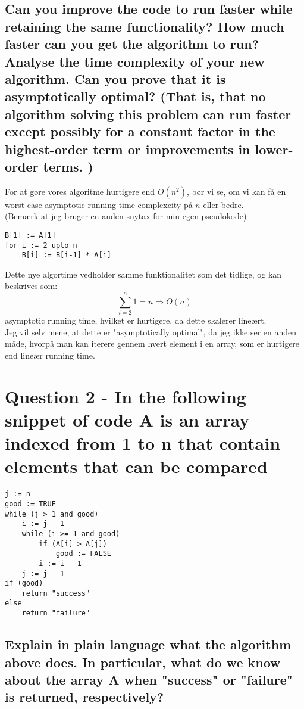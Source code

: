 \documentclass[a4paper,12pt]{article}
\begin{document}
\subsection[]{Can you improve the code to run faster while retaining the same functionality? How
much faster can you get the algorithm to run? Analyse the time complexity of your new
algorithm. Can you prove that it is asymptotically optimal? (That is, that no algorithm
solving this problem can run faster except possibly for a constant factor in the highest-order
term or improvements in lower-order terms. )}

For at gøre vores algoritme hurtigere end $O(n^2)$, bør vi se, om vi kan få en worst-case asymptotic running time complexcity på $n$ eller bedre.\\
(Bemærk at jeg bruger en anden snytax for min egen pseudokode)
\begin{lstlisting}
B[1] := A[1]     
for i := 2 upto n     
    B[i] := B[i-1] * A[i]
\end{lstlisting} 
Dette nye algortime vedholder samme funktionalitet som det tidlige, og kan beskrives som:
\[\sum_{i=2}^{n}1 = n \Rightarrow O(n)\]
asymptotic running time, hvilket er hurtigere, da dette skalerer lineært.\\
Jeg vil selv mene, at dette er "asymptotically optimal", da jeg ikke ser en anden måde, hvorpå man kan iterere gennem hvert element i en array, som er hurtigere end lineær running time.

\section[Question 2]{Question 2 - In the following snippet of code A is an array indexed from 1 to n that contain elements
that can be compared}

\begin{lstlisting}
j := n
good := TRUE
while (j > 1 and good)
    i := j - 1
    while (i >= 1 and good)
        if (A[i] > A[j])
            good := FALSE
        i := i - 1
    j := j - 1
if (good)
    return "success"
else
    return "failure"
\end{lstlisting}
    
\subsection[]{Explain in plain language what the algorithm above does. In particular, what do we know
about the array A when "success" or "failure" is returned, respectively?}
\end{document}
